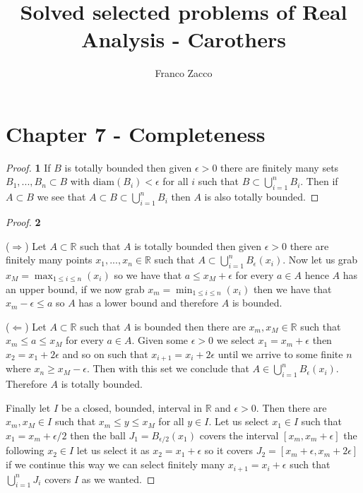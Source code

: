\documentclass[11pt]{article}
\title{\textbf{Solved selected problems of Real Analysis - Carothers}}
\author{Franco Zacco}
\date{}
\newcommand{\R}{\mathbb{R}}
\newcommand{\diam}{\text{diam}}
\theoremstyle{definition}
\begin{document}
\maketitle
\thispagestyle{empty}

\section*{Chapter 7 - Completeness}

	\begin{proof}{\textbf{1}}
        If $B$ is totally bounded then given $\epsilon > 0$ there are
        finitely many sets $B_1, ..., B_n \subset B$ with $\diam(B_i) < \epsilon$            
        for all $i$ such that $B \subset \bigcup_{i=1}^n B_i$. Then if
        $A \subset B$ we see that $A \subset B \subset \bigcup_{i=1}^n B_i$
        then $A$ is also totally bounded.
    \end{proof}
	\begin{proof}{\textbf{2}}

    ($\Rightarrow$) Let $A \subset \R$ such that $A$ is totally bounded then
    given $\epsilon > 0$ there are finitely many points $x_1,...,x_n \in \R$
    such that $A \subset \bigcup_{i=1}^n B_\epsilon(x_i)$. Now let us grab
    $x_M = \max_{1\leq i\leq n}(x_i)$ so we have that $a \leq x_M + \epsilon$
    for every $a \in A$ hence $A$ has an upper bound, if we now grab
    $x_m = \min_{1\leq i\leq n}(x_i)$ then we have that $ x_m - \epsilon \leq a$
    so $A$ has a lower bound and therefore $A$ is bounded.

    ($\Leftarrow$) Let $A \subset \R$ such that $A$ is bounded then there are
    $x_m, x_M \in \R$ such that $x_m \leq a\leq x_M$ for every $a \in A$.
    Given some $\epsilon > 0$ we select $x_1 = x_m + \epsilon$ then
    $x_2 = x_1 + 2\epsilon$ and so on such that $x_{i+1} = x_{i} + 2\epsilon$
    until we arrive to some finite $n$ where $x_n \geq x_M - \epsilon$. Then
    with this set we conclude that $A \in \bigcup_{i=1}^n B_\epsilon(x_i)$.
    Therefore $A$ is totally bounded.

    Finally let $I$ be a closed, bounded, interval in $\R$ and $\epsilon >0$.
    Then there are $x_m,x_M \in I$ such that $x_m \leq y \leq x_M$ for all
    $y \in I$. Let us select $x_1 \in I$ such that $x_1 = x_m + \epsilon/2$
    then the ball $J_1 = B_{\epsilon/2}(x_1)$ covers the interval
    $[x_m, x_m + \epsilon]$ the following $x_2 \in I$ let us select it as
    $x_2 = x_1 + \epsilon$ so it covers $J_2 = [x_m + \epsilon, x_m + 2\epsilon]$
    if we continue this way we can select finitely many $x_{i+1} = x_i + \epsilon$
    such that $\bigcup_{i=1}^n J_i$ covers $I$ as we wanted.
    \end{proof}
\end{document}

